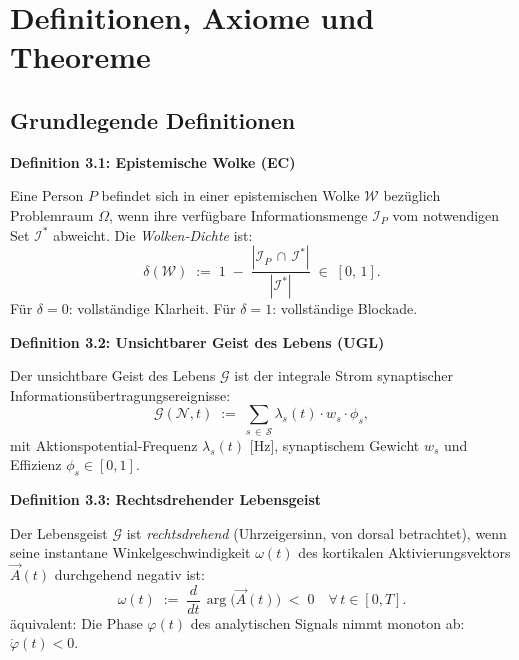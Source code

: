 ﻿\documentclass[12pt,a4paper]{report}
\theoremstyle{plain}
\theoremstyle{definition}
\theoremstyle{remark}
\begin{document}
	\chapter{Definitionen, Axiome und Theoreme}
	
	\section{Grundlegende Definitionen}
	
	
	\noindent\textbf{Definition 3.1: Epistemische Wolke (EC)}

		Eine Person $P$ befindet sich in einer epistemischen Wolke
		$\mathcal{W}$ bezüglich Problemraum $\Omega$, wenn ihre verfügbare
		Informationsmenge $\mathcal{I}_P$ vom notwendigen Set $\mathcal{I}^*$
		abweicht. Die \emph{Wolken-Dichte} ist:
		\[
		\delta(\mathcal{W}) \;:=\; 1 \;-\;
		\frac{|\mathcal{I}_P \,\cap\, \mathcal{I}^*|}{|\mathcal{I}^*|}
		\;\in\; [0,\,1].
		\]
		Für $\delta = 0$: vollständige Klarheit. Für $\delta = 1$: vollständige Blockade.

	
	
	\noindent\textbf{Definition 3.2: Unsichtbarer Geist des Lebens (UGL)}

		Der unsichtbare Geist des Lebens $\mathcal{G}$ ist der integrale
		Strom synaptischer Informationsübertragungsereignisse:
		\[
		\mathcal{G}(\mathcal{N}, t)
		\;:=\; \sum_{s \,\in\, \mathcal{S}}
		\lambda_s(t)\cdot w_s \cdot \phi_s,
		\]
		mit Aktionspotential-Frequenz $\lambda_s(t)$ [Hz], synaptischem Gewicht
		$w_s$ und Effizienz $\phi_s \in [0,1]$.

	
	
	\noindent\textbf{Definition 3.3: Rechtsdrehender Lebensgeist}

		\label{def:rechtsdrehend}
		Der Lebensgeist $\mathcal{G}$ ist \emph{rechtsdrehend} (Uhrzeigersinn,
		von dorsal betrachtet), wenn seine instantane Winkelgeschwindigkeit
		$\omega(t)$ des kortikalen Aktivierungsvektors $\vec{A}(t)$ durchgehend
		negativ ist:
		\[
		\omega(t) \;:=\; \frac{d}{dt}\,\arg\bigl(\vec{A}(t)\bigr)
		\;<\; 0 \quad \forall\, t \in [0, T].
		\]
		äquivalent: Die Phase $\varphi(t)$ des analytischen Signals nimmt
		monoton ab: $\dot{\varphi}(t) < 0$.
\end{document}
